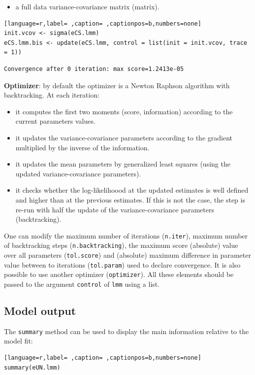 \documentclass[12pt]{article}
\begin{document}
\begin{itemize}
\item a full data variance-covariance matrix (matrix).
\end{itemize}
\begin{lstlisting}[language=r,label= ,caption= ,captionpos=b,numbers=none]
init.vcov <- sigma(eCS.lmm)
eCS.lmm.bis <- update(eCS.lmm, control = list(init = init.vcov, trace = 1))
\end{lstlisting}

\begin{verbatim}
Convergence after 0 iteration: max score=1.2413e-05
\end{verbatim}


\textbf{Optimizer}: by default the optimizer is a Newton Raphson algorithm
with backtracking. At each iteration:
\begin{itemize}
\item it computes the first two moments (score, information) according to
the current parameters values.
\item it updates the variance-covariance parameters according to the
gradient multiplied by the inverse of the information.
\item it updates the mean parameters by generalized least squares (using
the updated variance-covariance parameters).
\item it checks whether the log-likelihoood at the updated estimates is
well defined and higher than at the previous estimates. If this is
not the case, the step is re-run with half the update of the
variance-covariance parameters (backtracking).
\end{itemize}

One can modify the maximum number of iterations (\texttt{n.iter}), maximum
number of backtracking steps (\texttt{n.backtracking}), the maximum score
(absolute) value over all parameters (\texttt{tol.score}) and (absolute)
maximum difference in parameter value between to iterations
(\texttt{tol.param}) used to declare convergence. It is also possible to use
another optimizer (\texttt{optimizer}). All these elements should be passed
to the argument \texttt{control} of \texttt{lmm} using a list.

\clearpage

\subsection{Model output}
\label{sec:org65bacb4}

The \texttt{summary} method can be used to display the main information
relative to the model fit:
\begin{lstlisting}[language=r,label= ,caption= ,captionpos=b,numbers=none]
summary(eUN.lmm)
\end{lstlisting}
\end{document}
